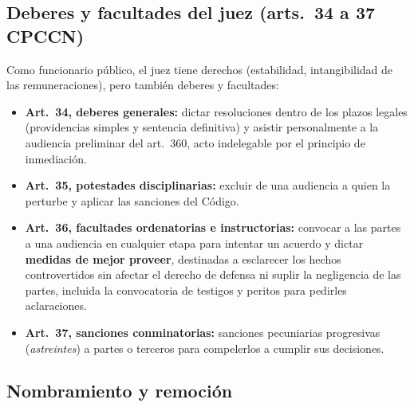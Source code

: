 \documentclass[12pt,oneside]{book}
\begin{document}

\subsection{Deberes y facultades del juez (arts.~34 a 37 CPCCN)}

Como funcionario público, el juez tiene derechos (estabilidad, intangibilidad de las remuneraciones), pero también deberes y facultades:

\begin{itemize}
\item \textbf{Art.~34, deberes generales:} dictar resoluciones dentro de los plazos legales (providencias simples y sentencia definitiva) %
y asistir personalmente a la audiencia preliminar del art.~360, acto indelegable por el principio de inmediación.
\item \textbf{Art.~35, potestades disciplinarias:} excluir de una audiencia a quien la perturbe y aplicar las sanciones del Código.
\item \textbf{Art.~36, facultades ordenatorias e instructorias:} convocar a las partes a una audiencia en cualquier etapa para intentar un acuerdo y dictar \textbf{medidas de mejor proveer}, destinadas a esclarecer los hechos controvertidos sin afectar el derecho de defensa ni suplir la negligencia de las partes, incluida la convocatoria de testigos y peritos para pedirles aclaraciones.
\item \textbf{Art.~37, sanciones conminatorias:} sanciones pecuniarias progresivas (\textit{astreintes}) a partes o terceros para compelerlos a cumplir sus decisiones.
\end{itemize}

\subsection{Nombramiento y remoción}
\end{document}
